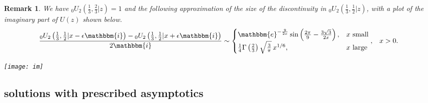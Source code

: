 \documentclass[12pt]{article}
\newcommand{\ee}[0] {\mathbbm{e}}
\newcommand{\ii}[0] {\mathbbm{i}}
\numberwithin{equation}{section}
\newtheorem{remark}[theorem]{Remark}
\newcommand{\FFf}[5] {{}_{#1}{#2}_{#3} \left(#4 | {#5} \right)}
\begin{document}
\begin{remark}
We have $\FFf{0}{U}{2}{\tfrac{1}{3},\tfrac{2}{3}}{z}=1$ and the following approximation of the size of the discontinuity in $\FFf{0}{U}{2}{\tfrac{1}{3},\tfrac{1}{2}}{z}$, with a plot of the imaginary part of $U(z)$ shown below.
\begin{equation*}
\frac{\FFf{0}{U}{2}{\tfrac{1}{3},\tfrac{1}{2}}{x-\epsilon \ii}-\FFf{0}{U}{2}{\tfrac{1}{3},\tfrac{1}{2}}{x+ \epsilon \ii}}{2\ii} \sim \begin{cases}
\ee^{-\frac{9}{2x}} \sin \left(\frac{2 \pi }{9}-\frac{3 \sqrt{3}}{2 x}\right)\text{,} & x \text{ small}\\
\frac{1}{4} \Gamma\left(\frac{2}{3}\right) \sqrt{\frac{3}{\pi }} \, x^{1/6}\text{,} & x \text{ large}
\end{cases}\text{,} \quad x > 0.
\end{equation*}
\begin{center}
\texttt{[image: im]}
\end{center}
\end{remark}

\subsection{solutions with prescribed asymptotics}
\end{document}
